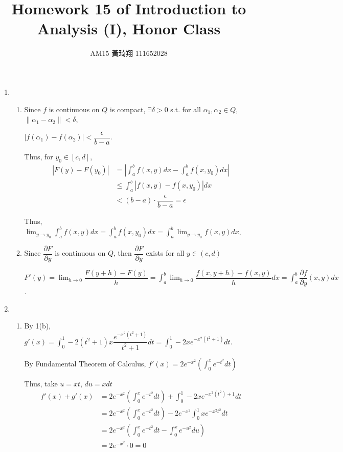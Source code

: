 \documentclass[12pt]{article}
\title{Homework 15 of Introduction to Analysis (I), Honor Class}
\author{AM15 黃琦翔 111652028}
\begin{document}
\maketitle
\begin{enumerate}
    \item \begin{enumerate}
        \item Since $f$ is continuous on $Q$ is compact, $\exists \delta > 0$ s.t. for all $\alpha_1, \alpha_2\in Q$, $\| \alpha_1 - \alpha_2\| < \delta$, 
        
        $|f(\alpha_1) - f(\alpha_2)| < \dfrac{\epsilon}{b-a}$.
        
        Thus, for $y_0 \in [c, d]$,\begin{align*}
        |F(y) - F(y_0)| &= |\int_a^b f(x, y) dx - \int_a^b f(x, y_0) dx|\\
        &\leq \int_a^b |f(x, y) - f(x, y_0)| dx\\
        &< (b-a) \cdot \dfrac{\epsilon}{b-a} = \epsilon
        \end{align*}

        Thus, $\displaystyle\lim_{y\to y_0}\displaystyle\int_a^b f(x, y) dx = \displaystyle\int_a^b f(x, y_0) dx = \displaystyle\int_a^b \displaystyle\lim_{y\to y_0} f(x, y)dx$.

        \item Since $\dfrac{\partial F}{\partial y}$ is continuous on $Q$, then $\dfrac{\partial F}{\partial y}$ exists for all $y\in (c, d)$
        
        $F'(y) = \displaystyle\lim_{h\to 0} \dfrac{F(y+h) - F(y)}{h} = \displaystyle\int_a^b \displaystyle\lim_{h\to 0} \dfrac{f(x, y+h) - f(x, y)}{h} dx = \displaystyle\int_a^b \dfrac{\partial f}{\partial y}(x, y) dx$.
    \end{enumerate}

    \item\begin{enumerate}
        \item By 1(b), $g'(x) = \displaystyle\int_0^1 -2(t^2+1)x\dfrac{e^{-x^2(t^2 + 1)}}{t^2+1}dt = \displaystyle\int_0^1 -2xe^{-x^2(t^2+1)} dt$.
        
        By Fundamental Theorem of Calculus, $f'(x) = 2e^{-x^2}(\displaystyle\int_0^x e^{-t^2} dt)$

        Thus, take $u = xt$, $du = xdt$\begin{align*}
            f'(x) + g'(x) &= 2e^{-x^2}(\int_0^x e^{-t^2} dt) + \int_0^1 -2xe^{-x^2(t^2)+1} dt\\
            &= 2e^{-x^2}(\int_0^x e^{-t^2} dt) - 2e^{-x^2}\int_0^1 xe^{-x^2t^2} dt\\
            &= 2e^{-x^2}(\int_0^x e^{-t^2} dt - \int_0^x e^{-u^2} du)\\
            &= 2e^{-x^2} \cdot 0 = 0
        \end{align*}


\end{enumerate}
\end{enumerate}
\end{document}

